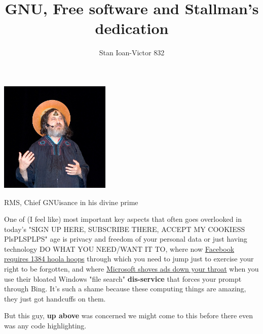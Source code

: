 \documentclass[sigplan,screen]{acmart}
\begin{document}
\title{GNU, Free software and Stallman's dedication}

\author{Stan Ioan-Victor 832}

\begin{teaserfigure}
	\includegraphics[width=200px]{pics/jesus-stallman.jpg}
	\centering
	\caption{RMS, Chief GNUisance in his divine prime}
	\label{fig:teaser}
\end{teaserfigure}

\maketitle

One of (I feel like) most important key aspects that often goes overlooked in today's "SIGN UP HERE, SUBSCRIBE THERE, ACCEPT MY COOKIESS PlsPLSPLPS" age is privacy and freedom of your personal data or just having technology DO WHAT YOU NEED/WANT IT TO, where now \href{https://www.youtube.com/watch?v=MPyJBJTHyO0}{Facebook requires 1384 hoola hoops}\cite{tantacrul} through which you need to jump just to exercise your right to be forgotten, and where \href{https://www.youtube.com/watch?v=LZzubS1ILTs}{Microsoft shoves ads down your throat}\cite{jakey} when you use their bloated Windows "file search" \textbf{dis-service}\cite{BarraDRM} that forces your prompt through Bing. It's such a shame because these computing things are amazing, they just got handcuffs on them.

But this guy, \textbf{up above} was concerned we might come to this before there even was any code highlighting.
\end{document}
